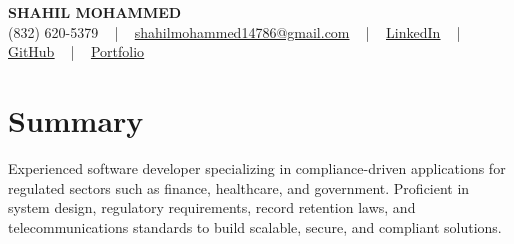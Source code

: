 \documentclass[letterpaper,10pt]{article}
\begin{document}
\begin{center}
    {\fontsize{14pt}{12pt}\selectfont \textbf{\MakeUppercase{Shahil Mohammed}}}\\ \vspace{2pt}
    \fontsize{10pt}{12pt}\selectfont (832) 620-5379 ~ | ~ \href{mailto:shahilmohammed14786@gmail.com}{shahilmohammed14786@gmail.com} ~ | ~  
    \href{https://www.linkedin.com/in/shahil-mohammed-9652931a1/}{\color{blue}\underline{LinkedIn}}  ~ | ~ 
    \href{https://github.com/freakbeast14}{\color{blue}\underline{GitHub}} ~ | ~ 
    \href{https://shahil-mohammed.netlify.app/}{\color{blue}\underline{Portfolio}}
    \vspace{-8pt}
\end{center}

\section{Summary}
\vspace{-2pt}\fontsize{8pt}{9pt}\selectfont
Experienced software developer specializing in compliance-driven applications for regulated sectors such as finance, healthcare, and government. Proficient in system design, regulatory requirements, record retention laws, and telecommunications standards to build scalable, secure, and compliant solutions.
 \vspace{-5pt}
 
\vspace{-2pt}
\end{document}
